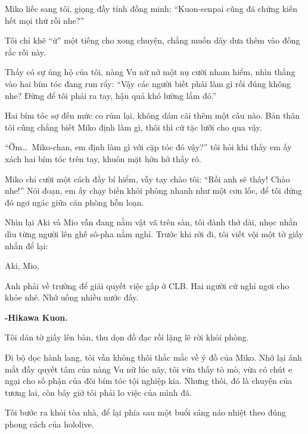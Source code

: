 \documentclass[../main.tex]{subfiles}
\begin{document}

Miko liếc sang tôi, giọng đầy tính đồng minh: ``Kuon-senpai cũng đã chứng kiến hết mọi thứ rồi nhe?''

Tôi chỉ khẽ ``ừ'' một tiếng cho xong chuyện, chẳng muốn dây dưa thêm vào đống rắc rối này.

Thấy có sự ủng hộ của tôi, nàng Vu nữ nở một nụ cười nham hiểm, nhìn thẳng vào hai bím tóc đang run rẩy: ``Vậy các người biết phải làm gì rồi đúng không nhe? Đừng để tôi phải ra tay, hậu quả khó lường lắm đó.''

Hai bím tóc sợ đến mức co rúm lại, không dám cãi thêm một câu nào. Bản thân tôi cũng chẳng biết Miko định làm gì, thôi thì cứ tặc lưỡi cho qua vậy.

\ct

``Ờm\dots\ Miko-chan, em định làm gì với cặp tóc đó vậy?'' tôi hỏi khi thấy em ấy xách hai bím tóc trên tay, khuôn mặt hớn hở thấy rõ.

Miko chỉ cười một cách đầy bí hiểm, vẫy tay chào tôi: ``Rồi anh sẽ thấy! Chào nhe!'' Nói đoạn, em ấy chạy biến khỏi phòng nhanh như một cơn lốc, để tôi đứng đó ngơ ngác giữa căn phòng hỗn loạn.

Nhìn lại Aki và Mio vẫn đang nằm vật vã trên sàn, tôi đành thở dài, nhọc nhằn dìu từng người lên ghế sô-pha nằm nghỉ. Trước khi rời đi, tôi viết vội một tờ giấy nhắn để lại:

\begin{tcolorbox}[
    colframe=vol,
    colback=white,
    boxrule=0.5pt,
    arc=0mm,
    left=5pt,
    right=5pt,
    top=5pt,
    bottom=5pt
  ]
  Aki, Mio,

  Anh phải về trường để giải quyết việc gấp ở CLB. Hai người cứ nghỉ ngơi cho khỏe nhé. Nhớ uống nhiều nước đấy.

  \hfill\textbf{-Hikawa Kuon.}
\end{tcolorbox}

Tôi dán tờ giấy lên bàn, thu dọn đồ đạc rồi lặng lẽ rời khỏi phòng.

\ct

Đi bộ dọc hành lang, tôi vẫn không thôi thắc mắc về ý đồ của Miko. Nhớ lại ánh mắt đầy quyết tâm của nàng Vu nữ lúc nãy, tôi vừa thấy tò mò, vừa có chút e ngại cho số phận của đôi bím tóc tội nghiệp kia. Nhưng thôi, đó là chuyện của tương lai, còn bây giờ tôi phải lo việc của mình đã.

Tôi bước ra khỏi tòa nhà, để lại phía sau một buổi sáng náo nhiệt theo đúng phong cách của hololive.

\omk
\end{document}
